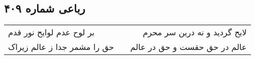 \begin{center}
\section*{رباعی شماره ۴۰۹}
\label{sec:sh409}
\begin{longtable}{l p{0.5cm} r}
بر لوح عدم لوایح نور قدم
&&
لایح گردید و نه درین سر محرم
\\
حق را مشمر جدا ز عالم زیراک
&&
عالم در حق حقست و حق در عالم
\\
\end{longtable}
\end{center}
